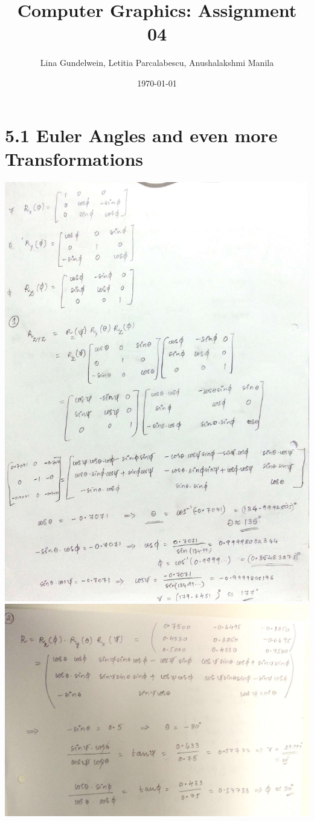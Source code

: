 \documentclass{article}
\title{Computer Graphics: Assignment 04} %
\author{Lina Gundelwein, Letitia Parcalabescu, Anushalakshmi Manila} %
\date{\today} %
\begin{document}
\maketitle 

\section*{5.1 Euler Angles and even more Transformations}
\includegraphics[width=\linewidth]{ex_05_1_1}\\
\includegraphics[width=\linewidth]{ex_05_1_2}\\
\end{document}
